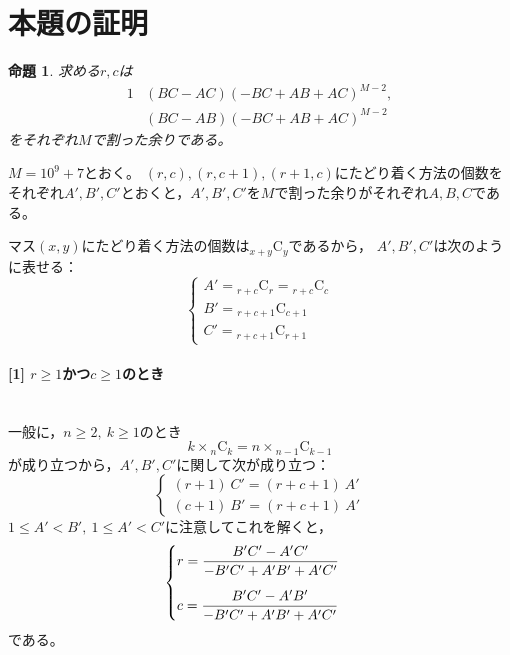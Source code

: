 \documentclass{article}
\makeatletter
\renewenvironment{proof}[1][\proofname]{\par
        \pushQED{\qed}
        \normalfont
        \topsep6\p@\@plus6\p@ \trivlist
        \item[\hskip\labelsep{\bfseries #1}\@addpunct{\bfseries}]\ignorespaces
    }{%
        \popQED\endtrivlist\@endpefalse
    }
\renewcommand{\proofname}{証明.}
\newtheorem{proposition}{命題}
\newcommand{\myparagraph}[1]{\paragraph{#1}\mbox{}\\}
\newcommand{\combination}[2]{{}_{#1} \mathrm{C}_{#2}}
\makeatother
\begin{document}
\section{本題の証明}

\begin{screen}
    \begin{proposition}
        \label{prop:main}
        求める$r, c$は
        \begin{alignat}{1}
            &(BC - AC)(-BC + AB + AC)^{M - 2}, \\
            &(BC - AB)(-BC + AB + AC)^{M - 2}
        \end{alignat}
        をそれぞれ$M$で割った余りである。
    \end{proposition}
\end{screen}

\begin{proof}
    $M = 10^9 + 7$とおく。
    $(r, c), (r, c + 1), (r + 1, c)$にたどり着く方法の個数を
    それぞれ$A', B', C'$とおくと，$A', B', C'$を$M$で割った余りがそれぞれ$A, B, C$である。

    マス$(x, y)$にたどり着く方法の個数は$\combination{x + y}{y}$であるから，
    $A', B', C'$は次のように表せる：
    \begin{equation}
        \begin{cases}
            A' = \combination{r + c}{r} = \combination{r + c}{c} \\
            B' = \combination{r + c + 1}{c + 1} \\
            C' = \combination{r + c + 1}{r + 1}
        \end{cases}
    \end{equation}

    \myparagraph{[1] $r \geq 1$かつ$c \geq 1$のとき}

    一般に，$n \geq 2,\ k \geq 1$のとき
    \begin{equation}
        k \times \combination{n}{k} = n \times \combination{n - 1}{k - 1}
    \end{equation}
    が成り立つから，$A', B', C'$に関して次が成り立つ：
    \begin{equation}
        \begin{cases}
            (r + 1)\ C' = (r + c + 1)\ A' \\
            (c + 1)\ B' = (r + c + 1)\ A'
        \end{cases}
    \end{equation}
    $1 \leq A' < B',\ 1 \leq A' < C'$に注意してこれを解くと，
    \begin{equation}
        \begin{cases}
            \label{r_c}
            \vspace{10pt}
            r = \dfrac{B'C' - A'C'}{-B'C' + A'B' + A'C'} \\
            c = \dfrac{B'C' - A'B'}{-B'C' + A'B' + A'C'}
        \end{cases}
    \end{equation}
    である。


\end{proof}
\end{document}
